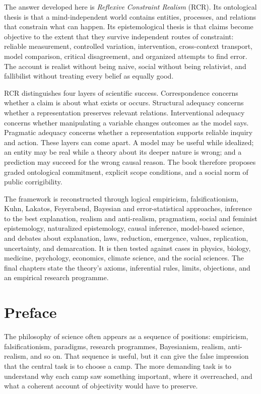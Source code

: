 \documentclass[11pt,openright]{book}
\newcommand{\RCR}{\textsc{RCR}\xspace}
\begin{document}
The answer developed here is \emph{Reflexive Constraint Realism} (\RCR). Its
ontological thesis is that a mind-independent world contains entities,
processes, and relations that constrain what can happen. Its epistemological
thesis is that claims become objective to the extent that they survive
independent routes of constraint: reliable measurement, controlled variation,
intervention, cross-context transport, model comparison, critical disagreement,
and organized attempts to find error. The account is realist without being
naive, social without being relativist, and fallibilist without treating every
belief as equally good.

\RCR distinguishes four layers of scientific success. Correspondence concerns
whether a claim is about what exists or occurs. Structural adequacy concerns
whether a representation preserves relevant relations. Interventional adequacy
concerns whether manipulating a variable changes outcomes as the model says.
Pragmatic adequacy concerns whether a representation supports reliable inquiry
and action. These layers can come apart. A model may be useful while idealized;
an entity may be real while a theory about its deeper nature is wrong; and a
prediction may succeed for the wrong causal reason. The book therefore proposes
graded ontological commitment, explicit scope conditions, and a social norm of
public corrigibility.

The framework is reconstructed through logical empiricism, falsificationism,
Kuhn, Lakatos, Feyerabend, Bayesian and error-statistical approaches, inference
to the best explanation, realism and anti-realism, pragmatism, social and
feminist epistemology, naturalized epistemology, causal inference, model-based
science, and debates about explanation, laws, reduction, emergence, values,
replication, uncertainty, and demarcation. It is then tested against cases in
physics, biology, medicine, psychology, economics, climate science, and the
social sciences. The final chapters state the theory's axioms, inferential rules,
limits, objections, and an empirical research programme.

\chapter*{Preface}
The philosophy of science often appears as a sequence of positions: empiricism,
falsificationism, paradigms, research programmes, Bayesianism, realism,
anti-realism, and so on. That sequence is useful, but it can give the false
impression that the central task is to choose a camp. The more demanding task is
to understand why each camp saw something important, where it overreached, and
what a coherent account of objectivity would have to preserve.
\end{document}
